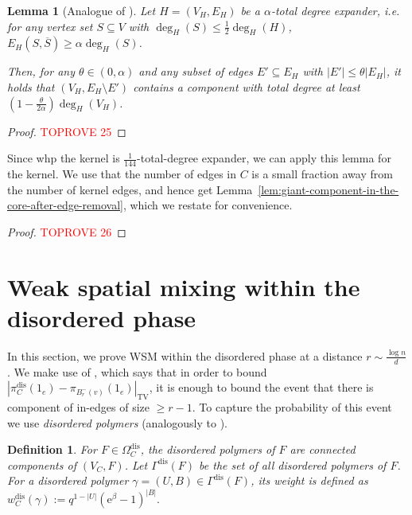 \documentclass[11pt]{article}
\theoremstyle{plain}
\newtheorem{lemma}[theorem]{Lemma}
\newtheorem{definition}[theorem]{Definition}
\newcommand{\emm}{\mathrm{e}}
\newcommand{\TV}{\mathrm{TV}}
\newcommand{\1}{\mathbb{1}}
\newcommand{\dis}{\mathrm{dis}}
\begin{document}
\begin{lemma}[Analogue of {\cite[Lemma 2.3]{trevisan2016expanders}}]\label{lem:giant-component-after-edge-removal-in-expanders}
    Let \(H=(V_H,E_H)\) be a \(\alpha\)-total degree expander, i.e. for any vertex set \(S\subseteq V\) with \(\deg_H(S)\leq \tfrac12\deg_H(H)\), \(E_H(S,\overline S)\geq\alpha\deg_H(S)\).

    Then, for any \(\theta\in(0,\alpha)\) and any subset of edges \(E'\subseteq E_H\) with \(|E'|\leq \theta |E_H|\), it holds that \((V_H, E_H\setminus E')\) contains a component with total degree at least \(\left(1 - \tfrac{\theta}{2\alpha}\right)\deg_H(V_H)\).
\end{lemma}
\begin{proof}\textcolor{red}{TOPROVE 25}\end{proof}

Since whp the kernel is \(\tfrac{1}{144}\)-total-degree expander, we can apply this lemma for the kernel. We use that the number of edges in \(C\) is a small fraction away from the number of kernel edges, and hence get Lemma~\ref{lem:giant-component-in-the-core-after-edge-removal}, which we restate for convenience.

\giantafterremoval*
\begin{proof}\textcolor{red}{TOPROVE 26}\end{proof}

\section{Weak spatial mixing within the disordered phase}\label{sec:disordered}

In this section, we prove WSM within the disordered phase at a distance \(r\sim \frac{\log n}{d}\). We make use of \cite[Lemma 5.3]{blanca2021random}, which says that in order to bound \(|\pi^\dis_C(1_e) - \pi_{B_r^-(v)}(1_e)|_\TV\), it is enough to bound the event that there is component of in-edges of size \(\geq r-1\). To capture the probability of this event we use \textit{disordered polymers} (analogously to \cite{RCM-Helmuth2020}).
\begin{definition}
    For \(F\in\Omega^\dis_C\), the \emph{disordered polymers} of \(F\) are \emph{connected components} of \((V_C,F)\). Let \(\Gamma^\dis(F)\) be the set of all disordered polymers of \(F\).
    For a disordered polymer \(\gamma = (U, B)\in\Gamma^\dis(F)\), its \textit{weight} is defined as $  w^\dis_C(\gamma) := q^{1-|U|} (\emm^\beta-1)^{|B|}.$
\end{definition}
\end{document}
